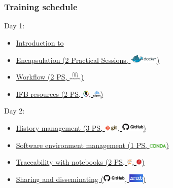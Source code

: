 \documentclass{beamer}
\begin{document}
\begin{frame}
\frametitle{Training schedule}
Day 1:
\begin{itemize}
    \item \hyperlink{Introduction}{Introduction to \FAIRB}
    \item \hyperlink{Encapsulation}{Encapsulation (2 Practical Sessions, \includegraphics[height=0.4cm]{shared/logo-docker-paysage.png})}
    \item \hyperlink{Workflow}{Workflow (2 PS, \includegraphics[height=0.4cm]{shared/logo-snakemake.png})}
    \item \hyperlink{IFB}{IFB resources (2 PS, \includegraphics[height=0.3cm]{shared/logo-singularity.png}, \includegraphics[height=0.3cm]{shared/logo-slurm.png})}
\end{itemize}
Day 2:
\begin{itemize}
    \item \hyperlink{History_management}{History management (3 PS, \includegraphics[height=0.3cm]{shared/logo-git.png}, \includegraphics[height=0.4cm]{shared/logo-github.png})}
    \item \hyperlink{Software_environment}{Software environment management (1 PS, \includegraphics[height=0.2cm]{shared/logo-conda.png})}
    \item \hyperlink{Notebooks}{Traceability with notebooks (2 PS, \includegraphics[height=0.3cm]{shared/logo-jupyter.png}, \includegraphics[height=0.3cm]{shared/logo-Rmarkdown.png})}
    \item \hyperlink{Sharing}{Sharing and disseminating (\includegraphics[height=0.4cm]{shared/logo-github.png}, \includegraphics[height=0.4cm]{shared/logo-zenodo.png})}

\end{itemize}
\end{frame}
\end{document}
